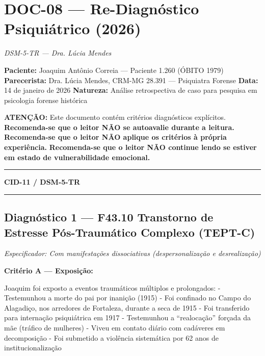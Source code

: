 \section*{\textbf{DOC-08} --- Re-Diagnóstico Psiquiátrico (2026)}

\noindent \textit{DSM-5-TR --- Dra. Lúcia Mendes}

\noindent \textbf{Paciente:} Joaquim Antônio Correia --- Paciente 1.260 (ÓBITO 1979)
\textbf{Parecerista:} Dra. Lúcia Mendes, CRM-MG 28.391 --- Psiquiatra Forense
\textbf{Data:} 14 de janeiro de 2026
\textbf{Natureza:} Análise retrospectiva de caso para pesquisa em psicologia forense histórica

\noindent \textbf{ATENÇÃO:} Este documento contém critérios diagnósticos explícitos. 
\textbf{Recomenda-se que o leitor NÃO se autoavalie durante a leitura.}
\textbf{Recomenda-se que o leitor NÃO aplique os critérios à própria experiência.}
\textbf{Recomenda-se que o leitor NÃO continue lendo se estiver em estado de vulnerabilidade emocional.}

\vspace{0.5em}\noindent\rule{\textwidth}{0.5pt}\vspace{0.5em}

\noindent \textbf{CID-11 / DSM-5-TR}

\vspace{0.5em}\noindent\rule{\textwidth}{0.5pt}\vspace{0.5em}

\subsection*{Diagnóstico 1 --- F43.10 Transtorno de Estresse Pós-Traumático Complexo (TEPT-C)}
\textit{Especificador: Com manifestações dissociativas (despersonalização e desrealização)}

\noindent \textbf{Critério A --- Exposição:}

\noindent Joaquim foi exposto a eventos traumáticos múltiplos e prolongados:
- Testemunhou a morte do pai por inanição (1915)
- Foi confinado no Campo do Alagadiço, nos arredores de Fortaleza, durante a seca de 1915
- Foi transferido para internação psiquiátrica em 1917
- Testemunhou a \textquotedblleft{}realocação\textquotedblright{} forçada da mãe (tráfico de mulheres)
- Viveu em contato diário com cadáveres em decomposição
- Foi submetido a violência sistemática por 62 anos de institucionalização


